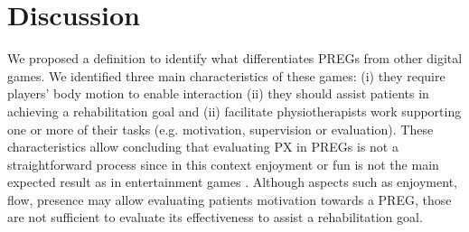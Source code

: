 \begin{table}[h]
\caption{Capabilities of each degree of autonomy of \acp{PREG}}
\label{tab:autonomy_dgree}
\myfloatalign
{}
\end{table}

\section{Discussion} %
\label{sec:discussion_char}
We proposed a definition to identify what differentiates \acp{PREG} from other digital games. We identified three main characteristics of these games: (i) they require players' body motion to enable interaction (ii) they should assist patients in achieving a rehabilitation goal and (ii) facilitate physiotherapists work supporting one or more of their tasks (e.g. motivation, supervision or evaluation). These characteristics allow concluding that evaluating \ac{PX} in \acp{PREG} is not a straightforward process since in this context enjoyment or fun is not the main expected result as in entertainment games \autocite{Fernandez}. Although aspects such as enjoyment, flow, presence may allow evaluating patients motivation towards a \ac{PREG}, those are not sufficient to evaluate its effectiveness to assist a rehabilitation goal.

